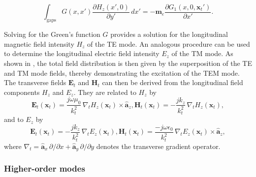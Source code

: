  \begin{equation}
 		\int_\mathrm{gaps} G(x, x') \frac{\partial H_z(x',0)}{\partial y'}\,dx' = -\mathbf{m}_e \frac{\partial G_1(x,0, \mathbf{x}_t')}{\partial x'}.
 \end{equation}

Solving for the Green's function $G$ provides a solution for the longitudinal 
magnetic field intensity $H_z$ of the TE mode. An analogous procedure can be 
used to determine the longitudinal electric field intensity $E_z$ of the TM mode. 
As shown in \cite{Wilson_1981}, the total field distribution is then given by the 
superposition of the TE and TM mode fields, thereby demonstrating the excitation 
of the TEM mode. The transverse fields $\mathbf{E}_t$ and $\mathbf{H}_t$ can then 
be derived from the longitudinal field components $H_z$ and $E_z$. They are 
related to $H_z$ by \cite[p.~3]{Wilson_1981}
\begin{subequations}
	\begin{equation}
		\mathbf{E}_t(\mathbf{x}_t) = \frac{j\omega\mu_0}{k_{t}^2}\, \nabla_t H_z(\mathbf{x}_t) \times \hat{\mathbf{a}}_z,
	\end{equation}
	\begin{equation}
		\mathbf{H}_t(\mathbf{x}_t) = -\frac{j k_{z}}{k_{t}^2}\, \nabla_t H_z(\mathbf{x}_t),
	\end{equation}
\end{subequations}
and to $E_z$ by
\begin{subequations}
	\begin{equation}
		\mathbf{E}_t(\mathbf{x}_t) = -\frac{j k_{z}}{k_{t}^2}\,\nabla_t E_z(\mathbf{x}_t),
	\end{equation}
	\begin{equation}
		\mathbf{H}_t(\mathbf{x}_t) = \frac{-j\omega\epsilon_0}{k_{t}^2}\, \nabla_t E_z(\mathbf{x}_t) \times \hat{\mathbf{a}}_z,
	\end{equation}
\end{subequations}
where $\nabla_t=\hat{\mathbf{a}}_x\,\partial/\partial x + \hat{\mathbf{a}}_y\,\partial/\partial y$ denotes the transverse gradient operator.

\subsubsection{Higher-order modes}\label{sec:higher-order-modes}

